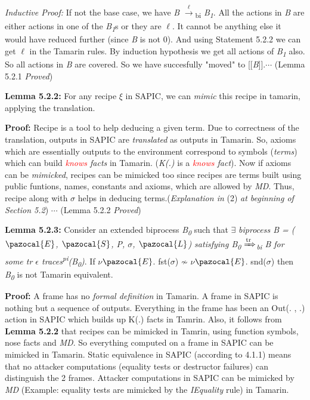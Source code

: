 \documentclass[11pt]{article}
\newcommand{\Sa}{\pazocal{S}}
\newcommand{\Lb}{\pazocal{L}}
\newcommand{\Ea}{\pazocal{E}}
\newcommand{\jannik}[1]{\textcolor{red}{#1}}
\begin{document}
{\it Inductive Proof: }If not the base case, we have {\it B} {$\xrightarrow[\text{}]{\text{$\ell$}}$}{\textsubscript{bi}} {\it B\textsubscript{1}}. All the actions in {\it B} are either actions in one of the {\it B\textsubscript{1}}s or they are $\ell$. It cannot be anything else it would have reduced further (since {\it B} is not 0). And using Statement 5.2.2 we can get $\ell$ in the Tamarin rules. By induction hypothesis we get all actions of {\it B\textsubscript{1}} also. So all actions in {\it B} are covered. So we have succesfully "moved" to [[{\it B}]].\hfill \hfill $\cdots$ (Lemma 5.2.1 {\it Proved})\newline

{\bf Lemma 5.2.2: }For any recipe $\xi$ in SAPIC, we can {\it mimic} this recipe in tamarin, applying the translation.   \newline

{\bf Proof: }Recipe is a tool to help deducing a given term.  Due to correctness of the translation, outputs in SAPIC are {\it translated} as outputs in Tamarin. So, axioms which are essentially outputs to the environment correspond to symbols ({\it terms}) which can build {\it \jannik{knows} facts} in Tamarin. ({\it K(.)} is a {\it \jannik{knows} fact}). Now if axioms can be {\it mimicked}, recipes can be mimicked too since recipes are terms built using public funtions, names, constants and axioms, which are allowed by {\it MD}. Thus, recipe along with $\sigma$ helps in deducing terms.({\it Explanation in} (2) {\it at beginning of Section 5.2}) \hfill \hfill $\cdots$ (Lemma 5.2.2 {\it Proved})\newline

{\bf Lemma 5.2.3: }Consider an extended biprocess {\it B\textsubscript{0}} such that $\exists$ {\it biprocess B = ($\Ea$, $\Sa$, P, $\sigma$, $\Lb$) satisfying B\textsubscript{0} {$\xRightarrow[\text{}]{\text{tr}}$}\textsubscript{bi} B for some tr $\epsilon$ traces\textsuperscript{pi}(B\textsubscript{0})}. If $\nu$$\Ea$. fst($\sigma$) $\not\sim$ $\nu$$\Ea$. snd($\sigma$) then {\it B\textsubscript{0}} is not Tamarin equivalent.\newline

{\bf Proof: }A frame has no {\it formal definition} in Tamarin. A frame in SAPIC is nothing but a sequence of outputs. Everything in the frame has been an Out(. , .) action in SAPIC which builds up K(.) facts in Tamrin. Also, it follows from {\bf Lemma 5.2.2} that recipes can be mimicked in Tamrin, using function symbols, nose facts and {\it MD}. So everything computed on a frame in SAPIC can be mimicked in Tamarin. Static equivalence in SAPIC (according to 4.1.1) means that no attacker computations (equality tests or destructor failures) can distinguish the 2 frames. Attacker computations in SAPIC can be mimicked by {\it MD} (Example: equality tests are mimicked by the {\it IEquality} rule) in Tamarin.\newline 
\end{document}
